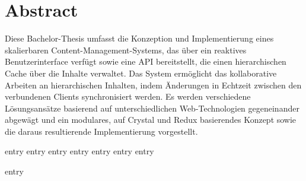\frontmatter
\maketitle

\chapter{Abstract}
\label{abstract}

Diese Bachelor-Thesis umfasst die Konzeption und Implementierung eines
skalierbaren Content-Management-Systems, das über ein reaktives
Benutzerinterface verfügt sowie eine API bereitstellt, die einen hierarchischen
Cache über die Inhalte verwaltet.  Das System ermöglicht das kollaborative
Arbeiten an hierarchischen Inhalten, indem Änderungen in Echtzeit zwischen den
verbundenen Clients synchronisiert werden.  Es werden verschiedene
Lösungsansätze basierend auf unterschiedlichen Web-Technologien gegeneinander
abgewägt und ein modulares, auf Crystal und Redux basierendes Konzept
sowie die daraus resultierende Implementierung vorgestellt.

\tableofcontents

\mainmatter
{entry}
{entry}
{entry}
{entry}
{entry}
{entry}
{entry}

\backmatter
\printbibliography%
{entry}
